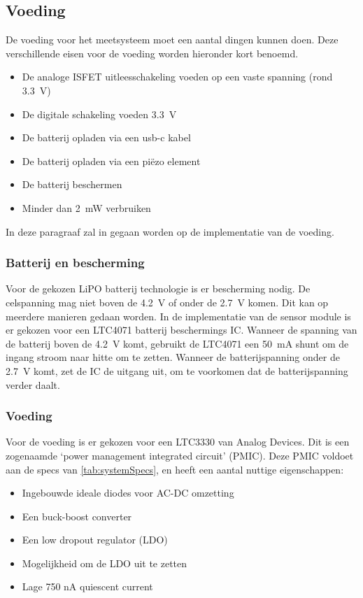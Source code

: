 \subsection{Voeding}
De voeding voor het \si{\pH} meetsysteem moet een aantal dingen kunnen doen. Deze verschillende eisen voor de voeding worden hieronder kort benoemd.
\begin{itemize}
    \item De analoge ISFET uitleesschakeling voeden op een vaste spanning (rond \qty{3.3}{\volt})
    \item De digitale schakeling voeden \qty{3.3}{\volt}
    \item De batterij opladen via een usb-c kabel
    \item De batterij opladen via een piëzo element
    \item De batterij beschermen
    \item Minder dan \qty{2}{\milli\watt} verbruiken
\end{itemize}
In deze paragraaf zal in gegaan worden op de implementatie van de voeding.

\subsubsection{Batterij en bescherming}

Voor de gekozen LiPO batterij technologie is er bescherming nodig. De celspanning mag niet boven de \qty{4.2}{\volt} of onder de \qty{2.7}{\volt} komen. Dit kan op meerdere manieren gedaan worden. In de implementatie van de sensor module is er gekozen voor een LTC4071 batterij beschermings IC. Wanneer de spanning van de batterij boven de \qty{4.2}{\volt} komt, gebruikt de LTC4071 een \qty{50}{\milli\ampere} shunt om de ingang stroom naar hitte om te zetten. Wanneer de batterijspanning onder de \qty{2.7}{\volt} komt, zet de IC de uitgang uit, om te voorkomen dat de batterijspanning verder daalt.

\subsubsection{Voeding}
Voor de voeding is er gekozen voor een LTC3330 van Analog Devices. Dit is een zogenaamde `power management integrated circuit' (PMIC). Deze PMIC voldoet aan de specs van \cref{tab:systemSpecs}, en heeft een aantal nuttige eigenschappen:
\begin{itemize}
    \item Ingebouwde ideale diodes voor AC-DC omzetting
    \item Een buck-boost converter
    \item Een low dropout regulator (LDO)
    \item Mogelijkheid om de LDO uit te zetten
    \item Lage 750 nA quiescent current
\end{itemize}

